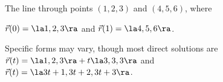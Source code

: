 {The line through points $(1,2,3)$ and $(4,5,6)$, where 

$\vec r(0) = \la 1,2,3\ra$ and $\vec r(1) = \la 4,5,6\ra$.
}
{Specific forms may vary, though most direct solutions are \\
$\vec r(t) = \la 1,2,3\ra +t\la 3,3,3\ra$ and \\
$\vec r(t) = \la 3t+1, 3t+2, 3t+3\ra$.
}
